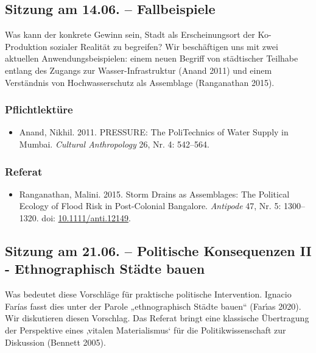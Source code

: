 \documentclass[
  ngerman,
]{article}
\providecommand{\tightlist}{%
  \setlength{\itemsep}{0pt}\setlength{\parskip}{0pt}}
\begin{document}
\hypertarget{sitzung-am-14.06.-fallbeispiele}{%
\subsection{Sitzung am 14.06. -- Fallbeispiele}\label{sitzung-am-14.06.-fallbeispiele}}

Was kann der konkrete Gewinn sein, Stadt als Erscheinungsort der Ko-Produktion sozialer Realität zu begreifen? Wir beschäftigen uns mit zwei aktuellen Anwendungsbeispielen: einem neuen Begriff von städtischer Teilhabe entlang des Zugangs zur Wasser-Infrastruktur (Anand 2011) und einem Verständnis von Hochwasserschutz als Assemblage (Ranganathan 2015).

\hypertarget{pflichtlektuxfcre-7}{%
\subsubsection*{Pflichtlektüre}\label{pflichtlektuxfcre-7}}

\begin{itemize}
\tightlist
\item
  Anand, Nikhil. 2011. PRESSURE: The PoliTechnics of Water Supply in Mumbai. \emph{Cultural Anthropology} 26, Nr. 4: 542--564.
\end{itemize}

\hypertarget{referat-7}{%
\subsubsection*{Referat}\label{referat-7}}

\begin{itemize}
\tightlist
\item
  Ranganathan, Malini. 2015. Storm Drains as Assemblages: The Political Ecology of Flood Risk in Post-Colonial Bangalore. \emph{Antipode} 47, Nr. 5: 1300--1320. doi: \href{https://doi.org/10.1111/anti.12149}{10.1111/anti.12149}.
\end{itemize}

\hypertarget{sitzung-am-21.06.-politische-konsequenzen-ii---ethnographisch-stuxe4dte-bauen}{%
\subsection{Sitzung am 21.06. -- Politische Konsequenzen II - Ethnographisch Städte bauen}\label{sitzung-am-21.06.-politische-konsequenzen-ii---ethnographisch-stuxe4dte-bauen}}

Was bedeutet diese Vorschläge für praktische politische Intervention. Ignacio Farías fasst dies unter der Parole „ethnographisch Städte bauen`` (Farı́as 2020). Wir diskutieren diesen Vorschlag. Das Referat bringt eine klassische Übertragung der Perspektive eines ‚vitalen Materialismus` für die Politikwissenschaft zur Diskussion (Bennett 2005).
\end{document}

